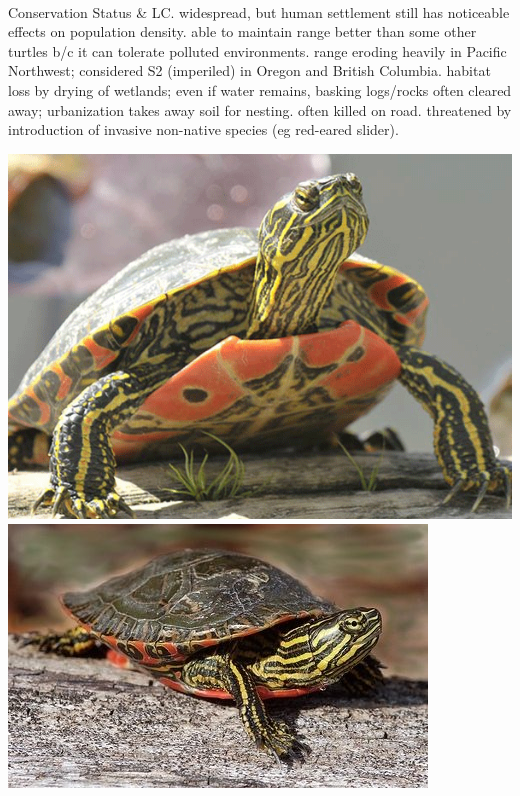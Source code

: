 \begin{center}
\begin{longtabu}
	\\
	\hline
	Conservation Status & 
	LC. widespread, but human settlement still has noticeable effects on population density. able to maintain range better than some other turtles b/c it can tolerate polluted environments. range eroding heavily in Pacific Northwest; considered S2 (imperiled) in Oregon and British Columbia. habitat loss by drying of wetlands; even if water remains, basking logs/rocks often cleared away; urbanization takes away soil for nesting. often killed on road. threatened by introduction of invasive non-native species (eg red-eared slider).
	\\
	\hline
\end{longtabu}
\includegraphics[scale=0.25]{testudines/emydidae/chrysemys/1}
\includegraphics[scale=0.4]{testudines/emydidae/chrysemys/2}
\end{center}